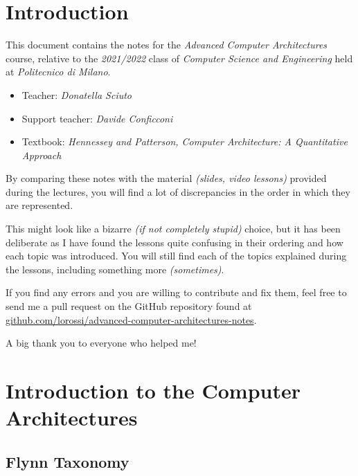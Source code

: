 \documentclass[english]{article}
\begin{document}

\section*{Introduction}

This document contains the notes for the \textit{Advanced Computer Architectures} course, relative to the \textit{2021/2022} class of \textit{Computer Science and Engineering} held at \textit{Politecnico di Milano}.

\bigskip

\begin{itemize}
  \item Teacher: \textit{Donatella Sciuto}
  \item Support teacher: \textit{Davide Conficconi}
  \item Textbook: \textit{Hennessey and Patterson, Computer Architecture: A Quantitative Approach}
\end{itemize}

\bigskip

By comparing these notes with the material \textit{(slides, video lessons)} provided during the lectures, you will find a lot of discrepancies in the order in which they are represented.

This might look like a bizarre \textit{(if not completely stupid)} choice, but it has been deliberate as I have found the lessons quite confusing in their ordering and how each topic was introduced.
You will still find each of the topics explained during the lessons, including something more \textit{(sometimes)}.

\bigskip

If you find any errors and you are willing to contribute and fix them, feel free to send me a pull request on the GitHub repository found at \href{https://github.com/lorossi/advanced-computer-architectures-notes}{github.com/lorossi/advanced-computer-architectures-notes}.

\bigskip

A big thank you to everyone who helped me!

\clearpage

\section{Introduction to the Computer Architectures}

\subsection{Flynn Taxonomy}
\label{sec:flynn-taxonomy}
\end{document}
